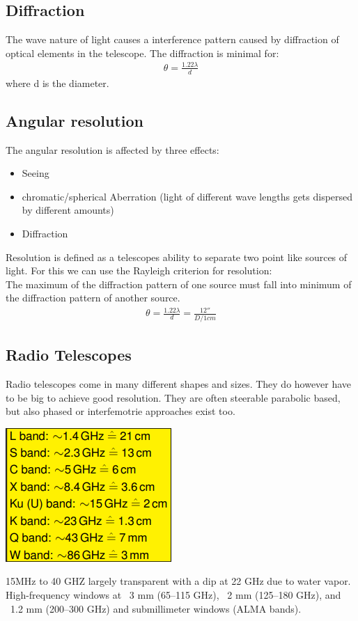 \documentclass[11pt,a4paper]{article}
\begin{document}
\subsection{Diffraction}
The wave nature of light causes a interference pattern caused by diffraction of optical elements in the telescope.
The diffraction is minimal for:
\begin{align*}
    \theta = \frac{1.22 \lambda}{d} 
\end{align*}
where d is the diameter.
\subsection{Angular resolution}
The angular resolution is affected by three effects: 
\begin{itemize}
    \item Seeing 
    \item chromatic/spherical Aberration (light of different wave lengths gets dispersed by different amounts)
    \item Diffraction 
\end{itemize}
Resolution is defined as a telescopes ability to separate two point like sources of light.
For this we can use the Rayleigh criterion for resolution: \\
The maximum of the diffraction pattern of one source must fall
into minimum of the diffraction pattern of another source.
\begin{align*}
    \theta = \frac{1.22 \lambda}{d}  = \frac {12''}{D/1cm}
\end{align*}
\subsection{Radio Telescopes}
Radio telescopes come in many different shapes and sizes.
They do however have to be big to achieve good resolution.
They are often steerable parabolic based, but also phased or interfemotrie approaches exist too.
\begin{center}
    \includegraphics[width=0.6\linewidth]{screenshot_2024-01-13-195458.png}
\end{center}
15MHz to 40 GHZ largely transparent with a dip at 22 GHz due to water vapor.
High-frequency windows at ~3 mm (65–115 GHz), ~2 mm (125–180 GHz), and
~1.2 mm (200–300 GHz) and submillimeter windows (ALMA bands).
\end{document}
